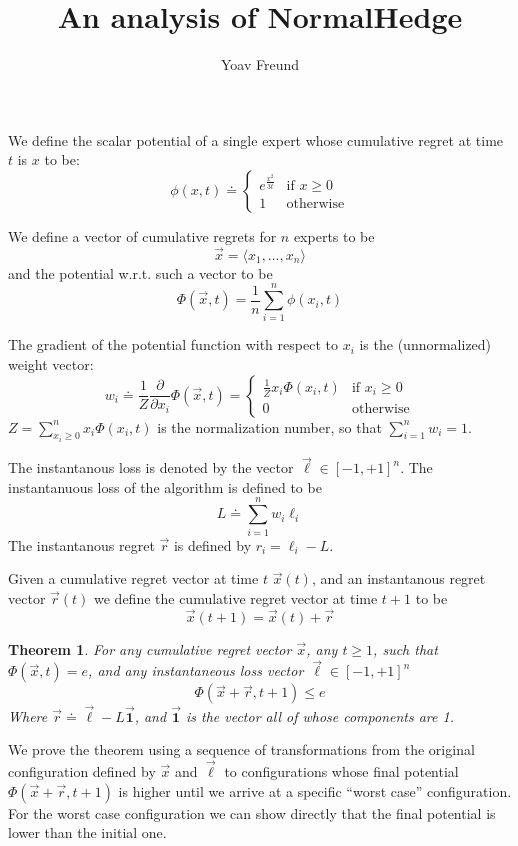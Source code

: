 \documentclass{article}[12pt]
\title{An analysis of NormalHedge}
\author{Yoav Freund}
\theoremstyle{plain}
\newtheorem{theorem}[lemma]{Theorem}
\newcommand{\vx}{\vec{x}}
\newcommand{\vr}{\vec{r}}
\newcommand{\vl}{\vec{\ell}}
\begin{document}
\maketitle

We define the scalar potential of a single expert whose cumulative
regret at time $t$ is $x$ to be:
\[
\phi(x,t) \doteq 
\begin{cases} 
e^{\frac{x^2}{3t}} &\mbox{if } x \geq 0 \\
1 & \mbox{otherwise}
\end{cases} 
\]

We define a vector of cumulative regrets for $n$ experts to be
\[
\vx = \langle x_1,\ldots,x_n\rangle
\]
and the potential w.r.t. such a vector to be
\[
\Phi(\vx,t) = \frac{1}{n} \sum_{i=1}^n \phi(x_i,t)
\]

The gradient of the potential function with respect to $x_i$ is the
(unnormalized) weight vector:
\[
w_i \doteq \frac{1}{Z} \frac{\partial}{\partial x_i} \Phi(\vx,t) 
= 
\begin{cases} 
\frac{1}{Z} x_i \Phi(x_i,t) &\mbox{if } x_i \geq 0 \\
0 & \mbox{otherwise}
\end{cases} 
\]
$Z=\sum_{x_i\geq 0}^n x_i \Phi(x_i,t)$ is the normalization number, so that
$\sum_{i=1}^n w_i=1$. 

The instantanous loss is denoted by the vector $\vl \in [-1,+1]^n$.
The instantanuous loss of the algorithm is defined to be
\[
L \doteq \sum_{i=1}^n w_i \ell_i
\]
The instantanous regret $\vr$ is defined by $r_i = \ell_i-L$.

Given a cumulative regret vector at time $t$ $\vx(t)$, and an
instantanous regret vector $\vr(t)$ we define the cumulative
regret vector at time $t+1$ to be
\[
\vx(t+1)=\vx(t)+\vr
\]

\newcommand{\oneVec}{\vec{\mathbf 1}}
\begin{theorem}
For any cumulative regret vector $\vx$, any $t \geq 1$,
such that $\Phi(\vx,t) = e$, 
and any instantaneous loss vector $\vl  \in [-1,+1]^n$
\[
\Phi(\vx+\vr,t+1) \leq e
\]
Where $\vr \doteq \vl-L \oneVec$, and $\oneVec$ is the vector all of
whose components are 1.
\end{theorem} 

We prove the theorem using a sequence of transformations from the
original configuration defined by $\vx$ and $\vl$ to configurations
whose final potential $\Phi(\vx+\vr,t+1)$ is higher until we arrive at
a specific ``worst case'' configuration. For the worst case
configuration we can show directly that the final potential is lower
than the initial one.
\end{document}

